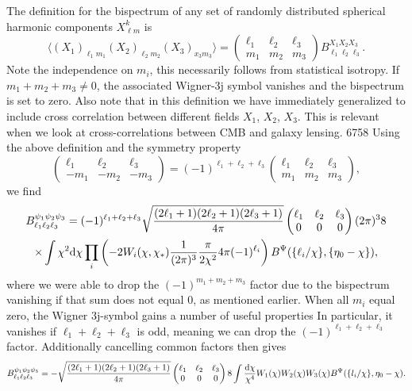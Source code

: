 \documentclass[11pt]{article} %
\DeclareRobustCommand{\d}{\ifmmode\text{d}\else d\fi}
\newcommand{\br}[1]{\ensuremath{\left( #1 \right)}}
\begin{document}
The definition for the bispectrum of any set of randomly distributed spherical harmonic components $X^k_{\ell m}$ is \cite{Hu2000}
\begin{equation*}
    \langle (X_1)_{\ell_1m_1}(X_2)_{\ell_2m_2}(X_3)_{x_3m_3} \rangle = \begin{pmatrix}
        \ell_1 & \ell_2 & \ell_3 \\ m_1 & m_2 & m_3
    \end{pmatrix}
    B_{\ell_1\ell_2\ell_3}^{X_1X_2X_3}.
\end{equation*}
Note the independence on $m_i$, this necessarily follows from statistical isotropy. %
If $m_1+m_2+m_3\neq 0$, the associated Wigner-3j symbol vanishes and the bispectrum is set to zero.
Also note that in this definition we have immediately generalized to include cross correlation between different fields $X_1$, $X_2$, $X_3$. This is relevant when we look at cross-correlations between CMB and galaxy lensing.
6758
Using the above definition and the symmetry property
\begin{equation*}
    \begin{pmatrix}
        \ell_1 & \ell_2 & \ell_3\\
        -m_1 & -m_2 & -m_3
      \end{pmatrix}
      =
      (-1)^{\ell_1+\ell_2+\ell_3}
      \begin{pmatrix}
        \ell_1 & \ell_2 & \ell_3\\
        m_1 & m_2 & m_3
      \end{pmatrix},
\end{equation*}
we find
\begin{gather*}
    B^{\psi_1\psi_2\psi_3}_{\ell_1\ell_2\ell_3}
    = (-1)^{\ell_1+\ell_2+\ell_3}
    \sqrt{\frac{(2\ell_1 + 1)(2\ell_2 + 1)(2\ell_3 + 1)}{4\pi}} \begin{pmatrix} \ell_1 & \ell_2 & \ell_3 \\ 0 & 0 & 0 \end{pmatrix}
    (2\pi)^3 8 \\
    \times \int \chi^2\d \chi\prod_i\br{-2 W_i(\chi, \chi_*)\frac{1}{(2\pi)^{3}}\frac{\pi}{2\chi^2}4\pi (-1)^{\ell_i}} B^\Psi(\{\ell_i/\chi\}, \{\eta_0-\chi\}),
\end{gather*}
where we were able to drop the $(-1)^{m_1+m_2+m_3}$ factor due to the bispectrum vanishing if that sum does not equal $0$, as mentioned earlier. When all $m_i$ equal zero, the Wigner 3j-symbol gains a number of useful properties %
In particular, it vanishes if $\ell_1+\ell_2+\ell_3$ is odd, meaning we can drop the $(-1)^{\ell_1+\ell_2+\ell_3}$ factor. Additionally cancelling common factors then gives
\begin{align}
    B^{\psi_1\psi_2\psi_3}_{\ell_1\ell_2\ell_3}
    =
    -\sqrt{\frac{(2\ell_1 + 1)(2\ell_2 + 1)(2\ell_3 + 1)}{4\pi}} \begin{pmatrix} \ell_1 & \ell_2 & \ell_3 \\ 0 & 0 & 0 \end{pmatrix} 8 \int \frac{\d \chi }{\chi^4} W_1(\chi)W_2(\chi)W_3(\chi) B^\Psi(\{l_i/\chi\}, \eta_0-\chi). \label{eq:lbsintermsofpsi}
\end{align}
\end{document}
